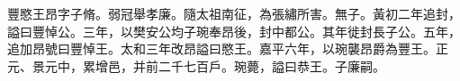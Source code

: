 
\begin{pinyinscope}
豐愍王昂字子脩。弱冠舉孝廉。隨太祖南征，為張繡所害。無子。黃初二年追封，謚曰豐悼公。三年，以樊安公均子琬奉昂後，封中都公。其年徙封長子公。五年，追加昂號曰豐悼王。太和三年改昂謚曰愍王。嘉平六年，以琬襲昂爵為豐王。正元、景元中，累增邑，并前二千七百戶。琬薨，謚曰恭王。子廉嗣。


\end{pinyinscope}